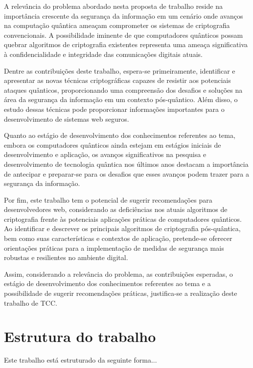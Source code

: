 A relevância do problema abordado nesta proposta de trabalho reside na importância crescente da segurança da informação em um cenário onde avanços na computação quântica ameaçam comprometer os sistemas de criptografia convencionais. A possibilidade iminente de que computadores quânticos possam quebrar algoritmos de criptografia existentes representa uma ameaça significativa à confidencialidade e integridade das comunicações digitais atuais.

Dentre as contribuições deste trabalho, espera-se primeiramente, identificar e apresentar as novas técnicas criptográficas capazes de resistir aos potenciais ataques quânticos, proporcionando uma compreensão dos desafios e soluções na área da segurança da informação em um contexto pós-quântico. Além disso, o estudo dessas técnicas pode proporcionar informações importantes para o desenvolvimento de sistemas web seguros.

Quanto ao estágio de desenvolvimento dos conhecimentos referentes ao tema, embora os computadores quânticos ainda estejam em estágios iniciais de desenvolvimento e aplicação, os avanços significativos na pesquisa e desenvolvimento de tecnologia quântica nos últimos anos destacam a importância de antecipar e preparar-se para os desafios que esses avanços podem trazer para a segurança da informação.

Por fim, este trabalho tem o potencial de sugerir recomendações para desenvolvedores web, considerando as deficiências nos atuais algoritmos de criptografia frente às potenciais aplicações práticas de computadores quânticos. Ao identificar e descrever os principais algoritmos de criptografia pós-quântica, bem como suas características e contextos de aplicação, pretende-se oferecer orientações práticas para a implementação de medidas de segurança mais robustas e resilientes no ambiente digital.

Assim, considerando a relevância do problema, as contribuições esperadas, o estágio de desenvolvimento dos conhecimentos referentes ao tema e a possibilidade de sugerir recomendações práticas, justifica-se a realização deste trabalho de TCC.

\section{Estrutura do trabalho}\label{sec:estruturaTrabalho}

Este trabalho está estruturado da seguinte forma...

